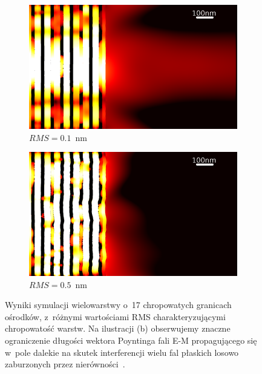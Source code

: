 \begin{figure}
	\centering
	\begin{subfigure}[b]{.45\textwidth}
		\includegraphics[width=\textwidth]{images/multilayer/oer-rms01.png}
		\caption{$RMS=0.1$~nm}
	\end{subfigure}
	\begin{subfigure}[b]{.45\textwidth}
		\includegraphics[width=\textwidth]{images/multilayer/oer-rms05.png}
		\caption{$RMS=0.5$~nm}
	\end{subfigure}
	\caption{Wyniki symulacji wielowarstwy o~17 chropowatych granicach ośrodków, z~różnymi wartościami RMS charakteryzującymi chropowatość warstw. Na ilustracji (b) obserwujemy znaczne ograniczenie długości wektora Poyntinga fali E-M propagującego się w~pole dalekie na skutek interferencji wielu fal płaskich losowo zaburzonych przez nierówności~\cite{pastuszczak2013engineering}.}
	\label{fig:rmsem}
	
\end{figure}

